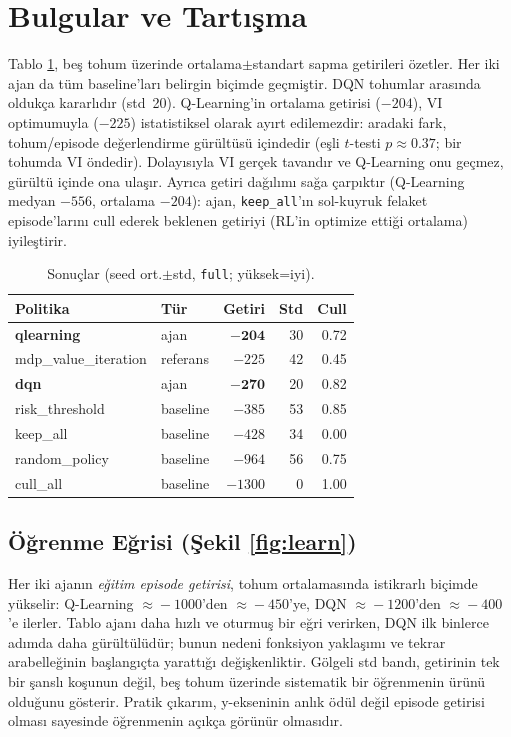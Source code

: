\documentclass[conference]{IEEEtran}
\begin{document}
\section{Bulgular ve Tartışma}
\label{sec:results}
Tablo \ref{tab:results}, beş tohum üzerinde ortalama$\pm$standart sapma getirileri
özetler. Her iki ajan da tüm baseline'ları belirgin biçimde geçmiştir. DQN tohumlar
arasında oldukça kararlıdır (std~20). Q-Learning'in ortalama getirisi ($-204$), VI
optimumuyla ($-225$) istatistiksel olarak ayırt edilemezdir: aradaki fark, tohum/episode
değerlendirme gürültüsü içindedir (eşli $t$-testi $p\approx0.37$; bir tohumda VI öndedir).
Dolayısıyla VI gerçek tavandır ve Q-Learning onu geçmez, gürültü içinde ona ulaşır. Ayrıca
getiri dağılımı sağa çarpıktır (Q-Learning medyan $-556$, ortalama $-204$): ajan,
\texttt{keep\_all}'ın sol-kuyruk felaket episode'larını cull ederek beklenen getiriyi
(RL'in optimize ettiği ortalama) iyileştirir.

\begin{table}[t]
\caption{Sonuçlar (seed ort.$\pm$std, \texttt{full}; yüksek=iyi).}
\label{tab:results}
\centering\footnotesize
\begin{tabular}{@{}l l r r r@{}}
\toprule
Politika & Tür & Getiri & Std & Cull \\
\midrule
\textbf{qlearning} & ajan & $\mathbf{-204}$ & 30 & 0.72 \\
mdp\_value\_iteration & referans & $-225$ & 42 & 0.45 \\
\textbf{dqn} & ajan & $\mathbf{-270}$ & 20 & 0.82 \\
risk\_threshold & baseline & $-385$ & 53 & 0.85 \\
keep\_all & baseline & $-428$ & 34 & 0.00 \\
random\_policy & baseline & $-964$ & 56 & 0.75 \\
cull\_all & baseline & $-1300$ & 0 & 1.00 \\
\bottomrule
\end{tabular}
\end{table}

\subsection{Öğrenme Eğrisi (Şekil \ref{fig:learn})}
Her iki ajanın \emph{eğitim episode getirisi}, tohum ortalamasında istikrarlı biçimde
yükselir: Q-Learning $\approx\!-1000$'den $\approx\!-450$'ye, DQN $\approx\!-1200$'den
$\approx\!-400$'e ilerler. Tablo ajanı daha hızlı ve oturmuş bir eğri verirken, DQN ilk
binlerce adımda daha gürültülüdür; bunun nedeni fonksiyon yaklaşımı ve tekrar
arabelleğinin başlangıçta yarattığı değişkenliktir. Gölgeli std bandı, getirinin tek bir
şanslı koşunun değil, beş tohum üzerinde sistematik bir öğrenmenin ürünü olduğunu
gösterir. Pratik çıkarım, y-ekseninin anlık ödül değil episode getirisi olması sayesinde
öğrenmenin açıkça görünür olmasıdır.
\end{document}
